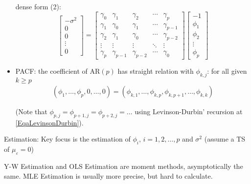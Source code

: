 \begin{itemize}[topsep=2pt,itemsep=0pt]
        dense form (2):
        \begin{equation}
            \begin{bmatrix}
                -\sigma ^2\\ 0\\ 0 \\ \vdots \\0
            \end{bmatrix} =
            \begin{bmatrix}
                \gamma _0&\gamma _1&\gamma _2&\cdots &\gamma _p\\
                \gamma _1&\gamma _0&\gamma _1&\cdots&\gamma _{p-1}\\
                \gamma _2&\gamma _1&\gamma _0&\cdots&\gamma _{p-2}\\
                \vdots&\vdots&\vdots&\ddots&\vdots\\
                \gamma _p&\gamma _{p-1}&\gamma _{p-2}&\cdots&\gamma _0
            \end{bmatrix}
            \begin{bmatrix}
                -1\\\phi _1\\\phi _2\\ \vdots \\\phi _p
            \end{bmatrix}
        \end{equation}

        \item PACF: the coefficient of AR$ (p) $ has straight relation with $ \phi _{k,j} $: for all given $ k\geq p $
        \begin{align}
            (\phi _1,\ldots,\phi _p,0,\ldots,0)=(\phi _{k,1},\ldots,\phi _{k,p},\phi _{k,p+1},\ldots,\phi _{k,k})
        \end{align}

        (Note that $ \phi _{p,j}=\phi _{p+1,j}=\phi _{p+2,j}=\ldots $ using Levinson-Durbin' recursion at \autoref{EqaLevinsonDurbin}).       
        
       
    \end{itemize}
    
\begin{point}
    Estimation: Key focus is the estimation of $ \phi _i,\,i=1,2,\ldots,p $ and $ \sigma ^2 $ (assume a TS of $ \mu _\varepsilon =0 $)
\end{point}

    Y-W Estimation and OLS Estimation are moment methods, asymptotically the same. MLE Estimation is usually more precise, but hard to calculate.

